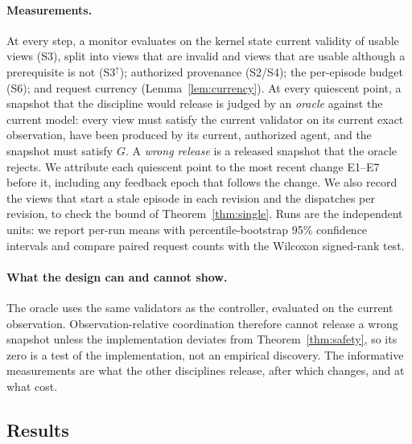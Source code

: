 \documentclass[pdflatex,sn-mathphys-num]{sn-jnl}
\theoremstyle{thmstyleone}%
\theoremstyle{thmstyletwo}%
\theoremstyle{thmstylethree}%
\begin{document}
\paragraph{Measurements.} At every step, a monitor evaluates on the kernel state current validity of usable views (S3), split into views that are invalid and views that are usable although a prerequisite is not (S3$^{\uparrow}$); authorized provenance (S2/S4); the per-episode budget (S6); and request currency (Lemma~\ref{lem:currency}). At every quiescent point, a snapshot that the discipline would release is judged by an \emph{oracle} against the current model: every view must satisfy the current validator on its current exact observation, have been produced by its current, authorized agent, and the snapshot must satisfy $G$. A \emph{wrong release} is a released snapshot that the oracle rejects. We attribute each quiescent point to the most recent change E1--E7 before it, including any feedback epoch that follows the change. We also record the views that start a stale episode in each revision and the dispatches per revision, to check the bound of Theorem~\ref{thm:single}. Runs are the independent units: we report per-run means with percentile-bootstrap 95\% confidence intervals and compare paired request counts with the Wilcoxon signed-rank test.

\paragraph{What the design can and cannot show.} The oracle uses the same validators as the controller, evaluated on the current observation. Observation-relative coordination therefore cannot release a wrong snapshot unless the implementation deviates from Theorem~\ref{thm:safety}, so its zero is a test of the implementation, not an empirical discovery. The informative measurements are what the other disciplines release, after which changes, and at what cost.

\subsection{Results}\label{sec:case-results}
\end{document}
